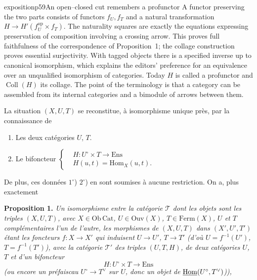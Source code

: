 \begin{dcomment}{exposition}{p59}{An open--closed cut remembers a profunctor}
A functor preserving the two parts consists of functors $f_U,f_T$ and a natural transformation $H\to H'(f_U^{\mathrm{op}}\times f_T)$. The naturality squares are exactly the equations expressing preservation of composition involving a crossing arrow. This proves full faithfulness of the correspondence of Proposition~1; the collage construction proves essential surjectivity. With tagged objects there is a specified inverse up to canonical isomorphism, which explains the editors' preference for an equivalence over an unqualified isomorphism of categories. Today $H$ is called a profunctor and $\operatorname{Coll}(H)$ its collage. The point of the terminology is that a category can be assembled from its internal categories and a bimodule of arrows between them.
\end{dcomment}


La situation $(X,U,T)$ se reconstitue, à isomorphisme unique près, par la connaissance de

\begin{enumerate}[label={}]
\item[$1^\circ$)] Les deux catégories $U$, $T$.
\item[$2^\circ$)] Le bifoncteur $\displaystyle\left\{\begin{aligned}
&H : U^\circ \times T \longrightarrow \mathrm{Ens}\\[1ex]
&H(u,t) = \mathrm{Hom}_X(u,t).
\end{aligned}\right.$
\end{enumerate}

De plus, ces données $1^\circ$) $2^\circ$) en sont soumises à aucune restriction. On a, plus exactement %

\textbf{Proposition 1.} \textit{Un isomorphisme} \textit{entre la catégorie $\mathcal{T}$ dont les objets sont les triples $(X,U,T)$, avec $X \in \mathrm{Ob}\,\mathrm{Cat}$, $U \in \mathrm{Ouv}(X)$, $T \in \mathrm{Ferm}(X)$, $U$ et $T$ complémentaires l'un de l'autre, les morphismes de $(X,U,T)$ dans $(X',U',T')$ étant les foncteurs $f : X \longrightarrow X'$ qui induisent $U \longrightarrow U'$, $T \longrightarrow T'$ (d'où
$U = f^{-1}(U')$, $T = f^{-1}(T')$), avec la catégorie $\mathcal{T}'$ des triples $(U,T,H)$, de deux catégories $U$, $T$ et d'un bifoncteur}
\[
H : U^\circ \times T \longrightarrow \mathrm{Ens}
\]
\hspace*{2em}\textit{(ou encore un préfaiscau $U^\circ \longrightarrow T^\vee$ sur $U$, donc un objet de} $\underline{\mathrm{Hom}}(U^\circ,T^\vee)$\textit{)),} %

